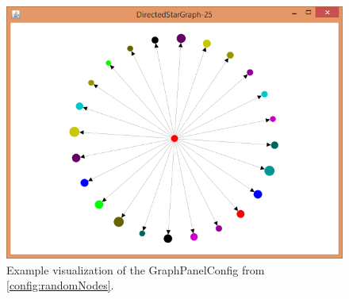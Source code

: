 \begin{figure} [h]
\centering
\includegraphics [scale=0.9] {images/random-node-example}
\caption{Example visualization of the GraphPanelConfig from \ref{config:randomNodes}.}
\label{fig:randomNodesVis}
\end{figure}

